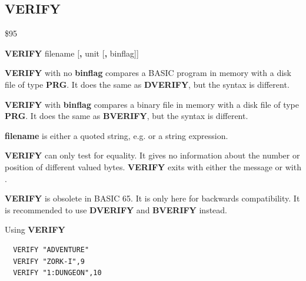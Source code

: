 \subsection{VERIFY}
\begin{description}[leftmargin=2cm,style=nextline]
\item [Token:] \$95
\item [Format:] {\bf VERIFY} filename [{\bf,} unit [{\bf,} binflag]]
\item [Usage:] {\bf VERIFY} with no {\bf binflag} compares a BASIC program
                in memory with a disk file of type {\bf PRG}.
                It does the same as {\bf DVERIFY}, but the syntax is different.

               {\bf VERIFY} with {\bf binflag} compares a binary file
               in memory with a disk file of type {\bf PRG}.
               It does the same as {\bf BVERIFY}, but the syntax is different.

               {\bf filename} is either a quoted string, e.g.  or
               a string expression.

               \unitdefinition

\item [Remarks:]
   {\bf VERIFY} can only test for equality. It gives no information
   about the number or position of different valued bytes.
    {\bf VERIFY} exits with either the message 
   or with .

   {\bf VERIFY} is obsolete in BASIC 65. It is only here for backwards
    compatibility. It is recommended to use {\bf DVERIFY} and {\bf BVERIFY} instead.


\item [Examples:] Using {\bf VERIFY}
\begin{tcolorbox}[colback=black,coltext=white]
\verbatimfont{\codefont}
\begin{verbatim}
  VERIFY "ADVENTURE"
  VERIFY "ZORK-I",9
  VERIFY "1:DUNGEON",10
\end{verbatim}
\end{tcolorbox}
\end{description}


\newpage
